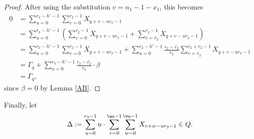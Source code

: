 \begin{proof}
After using the substitution $v=n_1-1-x_1$, this becomes
\begin{align*}
0&=\sum_{u=0}^{r_3-h'-1} \sum_{v=0}^{r_2-1} X_{q+v-ur_2-1}\\
&=\sum_{u=0}^{r_3-h'-1} \left(\sum_{v=0}^{\overline{r_2}-1} X_{q+v-ur_2-1}+\sum_{v=\overline{r_2}}^{r_2-1} X_{q+v-ur_2-1}\right)\\
&=\sum_{u=0}^{r_3-h'-1} \sum_{v=0}^{\overline{r_2}-1} X_{q+v-ur_2-1}+\sum_{u=0}^{r_3-h'-1}\frac{r_2-\overline{r_2}}{r_3}\sum_{v=\overline{r_2}}^{\overline{r_2}+r_3-1} X_{q+v-ur_2-1}\\
&=\Gamma_q+\sum_{u=0}^{r_3-h'-1}\frac{r_2-\overline{r_2}}{r_3}\cdot \beta\\
&=\Gamma_q,
\end{align*}
since $\beta=0$ by Lemma \ref{AB}.
\end{proof}

Finally, let $$\Delta:=\sum_{u=0}^{r_3-1}u\cdot\sum_{v=0}^{\uo-1} \sum _{w=0}^{\vo-1} X_{v+w-ur_2-1}\in Q.$$

